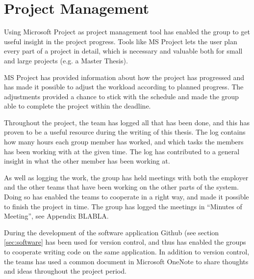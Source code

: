 \chapter{Project Management}
Using Microsoft Project as project management tool has enabled the group to get useful insight in the project progress. Tools like MS Project lets the user plan every part of a project in detail, which is necessary and valuable both for small and large projects (e.g. a Master Thesis).

MS Project has provided information about how the project has progressed and has made it possible to adjust the workload according to planned progress. The adjustments provided a chance to stick with the schedule and made the group able to complete the project within the deadline.

Throughout the project, the team has logged all that has been done, and this has proven to be a useful resource during the writing of this thesis. The log contains how many hours each group member has worked, and which tasks the members has been working with at the given time. The log has contributed to a general insight in what the other member has been working at.

As well as logging the work, the group has held meetings with both the employer and the other teams that have been working on the other parts of the system. Doing so has enabled the teams to cooperate in a right way, and made it possible to finish the project in time. The group has logged the meetings in ``Minutes of Meeting'', see Appendix BLABLA. 

During the development of the software application Github (see section \ref{sec:software} has been used for version control, and thus has enabled the groups to cooperate writing code on the same application. In addition to version control, the teams has used a common document in Microsoft OneNote to share thoughts and ideas throughout the project period.